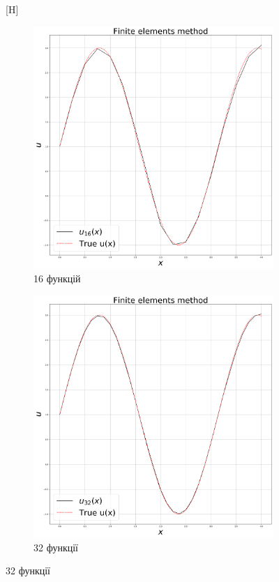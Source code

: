 \begin{figure}[H]
\begin{figure}[H]
\end{figure}[H]
    \begin{subfigure}{.5\textwidth}
    \centering
    \includegraphics[width=.95\linewidth]{fem_16.png}
    \caption{16 функцій}
    \end{subfigure}
    \hfill
    \begin{subfigure}{.5\textwidth}
    \centering
    \includegraphics[width=.95\linewidth]{fem_32.png}
    \caption{32 функції}
    \end{subfigure}
\end{figure}


